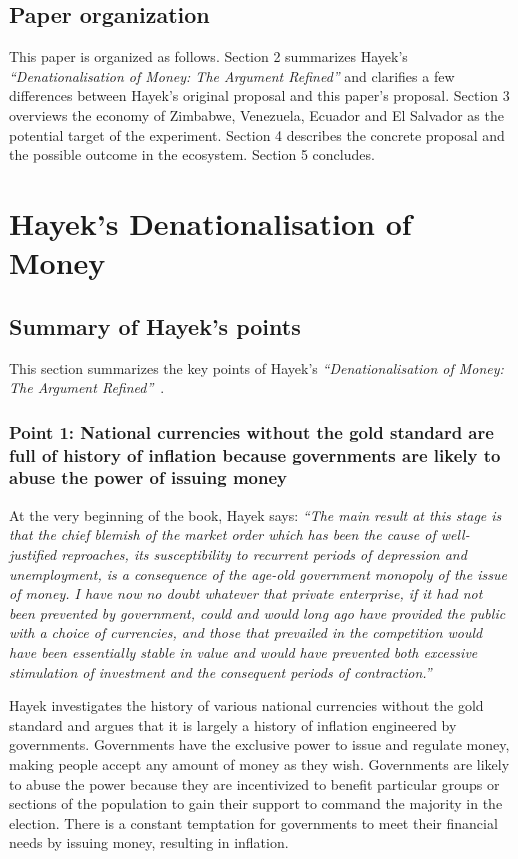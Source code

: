\documentclass[dvipdfmx,a4paper]{article}
\begin{document}
\subsection{Paper organization}

This paper is organized as follows. Section 2 summarizes Hayek's \textit{``Denationalisation of Money: The Argument Refined''} and clarifies a few differences between Hayek's original proposal and this paper's proposal. Section 3 overviews the economy of Zimbabwe, Venezuela, Ecuador and El Salvador as the potential target of the experiment. Section 4 describes the concrete proposal and the possible outcome in the ecosystem. Section 5 concludes.

\section{Hayek's Denationalisation of Money}

\subsection{Summary of Hayek's points}

This section summarizes the key points of Hayek's \textit{``Denationalisation of Money: The Argument Refined''}~\cite{hayekbook}.

\subsubsection*{Point 1: National currencies without the gold standard are full of history of inflation because governments are likely to abuse the power of issuing money}

At the very beginning of the book, Hayek says: \textit{``The main result at this stage is that the chief blemish of the market order which has been the cause of well-justified reproaches, its susceptibility to recurrent periods of depression and unemployment, is a consequence of the age-old government monopoly of the issue of money. I have now no doubt whatever that private enterprise, if it had not been prevented by government, could and would long ago have provided the public with a choice of currencies, and those that prevailed in the competition would have been essentially stable in value and would have prevented both excessive stimulation of investment and the consequent periods of contraction.''}

Hayek investigates the history of various national currencies without the gold standard and argues that it is largely a history of inflation engineered by governments. Governments have the exclusive power to issue and regulate money, making people accept any amount of money as they wish. Governments are likely to abuse the power because they are incentivized to benefit particular groups or sections of the population to gain their support to command the majority in the election. There is a constant temptation for governments to meet their financial needs by issuing money, resulting in inflation.
\end{document}
